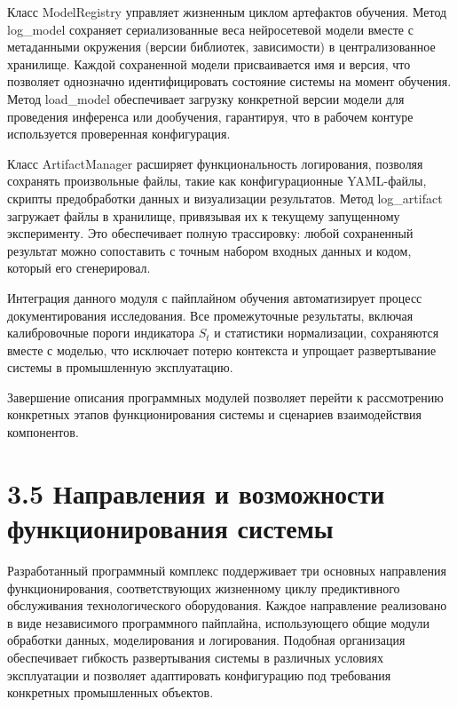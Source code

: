 \documentclass[14pt, a4paper, oneside]{extreport}
\begin{document}
Класс {ModelRegistry} управляет жизненным циклом артефактов обучения. Метод {log\_model} сохраняет сериализованные веса нейросетевой модели вместе с метаданными окружения (версии библиотек, зависимости) в централизованное хранилище. Каждой сохраненной модели присваивается имя и версия, что позволяет однозначно идентифицировать состояние системы на момент обучения. Метод {load\_model} обеспечивает загрузку конкретной версии модели для проведения инференса или дообучения, гарантируя, что в рабочем контуре используется проверенная конфигурация.

Класс ArtifactManager расширяет функциональность логирования, позволяя сохранять произвольные файлы, такие как конфигурационные YAML-файлы, скрипты предобработки данных и визуализации результатов. Метод log\_artifact загружает файлы в хранилище, привязывая их к текущему запущенному эксперименту. Это обеспечивает полную трассировку: любой сохраненный результат можно сопоставить с точным набором входных данных и кодом, который его сгенерировал.

Интеграция данного модуля с пайплайном обучения автоматизирует процесс документирования исследования. Все промежуточные результаты, включая калибровочные пороги индикатора $S_t$ и статистики нормализации, сохраняются вместе с моделью, что исключает потерю контекста и упрощает развертывание системы в промышленную эксплуатацию.

Завершение описания программных модулей позволяет перейти к рассмотрению конкретных этапов функционирования системы и сценариев взаимодействия компонентов.


\vspace{1em}
\section{3.5 Направления и возможности функционирования системы}
\vspace{1em}
Разработанный программный комплекс поддерживает три основных направления функционирования, соответствующих жизненному циклу предиктивного обслуживания технологического оборудования. Каждое направление реализовано в виде независимого программного пайплайна, использующего общие модули обработки данных, моделирования и логирования. Подобная организация обеспечивает гибкость развертывания системы в различных условиях эксплуатации и позволяет адаптировать конфигурацию под требования конкретных промышленных объектов.



\vspace{1em}
\end{document}
